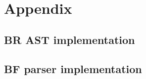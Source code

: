 \documentclass[../main.tex]{subfiles}
\begin{document}
\appendix
\section{Appendix}

\subsection{BR AST implementation} \label{app:bf-ast}



\clearpage{}
\subsection{BF parser implementation} \label{app:bf-parser}


\end{document}
